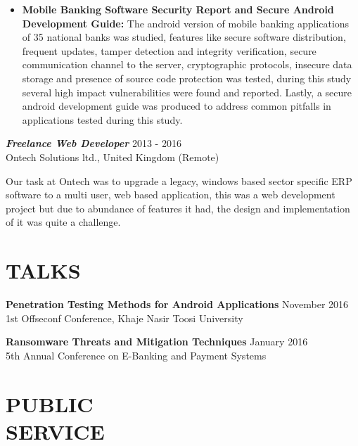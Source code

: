 \documentclass[margin, 10pt]{res} %
\begin{document}
\begin{resume}
\begin{itemize} \itemsep -2pt %
\item \textbf{Mobile Banking Software Security Report and Secure Android Development Guide:} The  android  version  of  mobile  banking  applications  of  35  national  banks  was studied,   features   like   secure   software   distribution,   frequent   updates,   tamper detection  and  integrity  verification,  secure  communication  channel  to  the  server, cryptographic  protocols,  insecure  data  storage  and  presence  of  source code protection  was tested,  during  this  study  several  high  impact  vulnerabilities  were  found  and reported.  Lastly,  a  secure  android  development  guide  was  produced  to  address common pitfalls in applications tested during this study.
\end{itemize}

{\sl \textbf{Freelance Web Developer}} \hfill 2013 - 2016\\
Ontech Solutions ltd., United Kingdom (Remote)


Our  task  at  Ontech  was  to  upgrade  a  legacy,  windows  based sector specific ERP software to a multi user, web based application, this was a web development  project  but  due  to  abundance  of     features  it  had,  the  design  and implementation of it was quite a challenge.




\section{TALKS}

\textbf{Penetration Testing Methods for Android Applications} \hfill November 2016\\
1st Offseconf Conference, Khaje Nasir Toosi University

\textbf{Ransomware Threats and Mitigation Techniques} \hfill January 2016 \\
5th Annual Conference on E-Banking and Payment Systems

\section{PUBLIC \\ SERVICE}


\end{resume}
\end{document}
